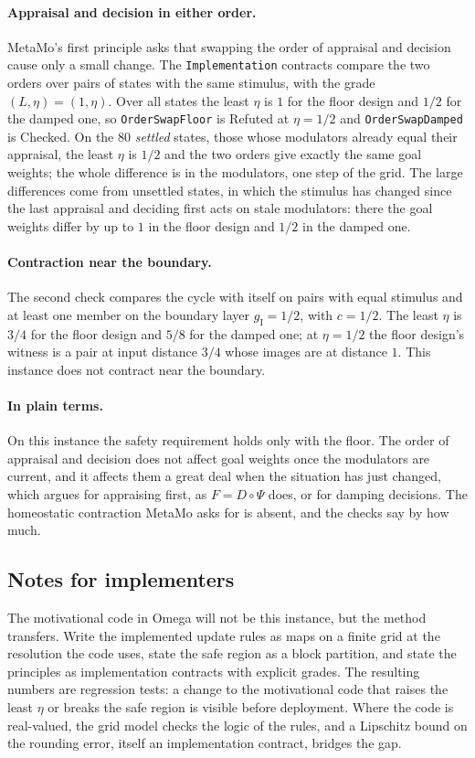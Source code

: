 \documentclass[11pt]{article}
\newcommand{\code}[1]{\texttt{#1}}
\newcommand{\plain}{\paragraph{In plain terms.}}
\theoremstyle{definition}
\theoremstyle{plain}
\begin{document}
\paragraph{Appraisal and decision in either order.} MetaMo's first principle asks that swapping the
order of appraisal and decision cause only a small change. The \code{Implementation} contracts
compare the two orders over pairs of states with the same stimulus, with the grade
$(L,\eta)=(1,\eta)$. Over all states the least $\eta$ is $1$ for the floor design and $1/2$ for the
damped one, so \code{OrderSwapFloor} is Refuted at $\eta=1/2$ and \code{OrderSwapDamped} is Checked.
On the $80$ \emph{settled} states, those whose modulators already equal their appraisal, the least
$\eta$ is $1/2$ and the two orders give exactly the same goal weights; the whole difference is in
the modulators, one step of the grid. The large differences come from unsettled states, in which the
stimulus has changed since the last appraisal and deciding first acts on stale modulators: there
the goal weights differ by up to $1$ in the floor design and $1/2$ in the damped one.

\paragraph{Contraction near the boundary.} The second check compares the cycle with itself on pairs
with equal stimulus and at least one member on the boundary layer $g_{\mathrm{I}}=1/2$, with
$c=1/2$. The least $\eta$ is $3/4$ for the floor design and $5/8$ for the damped one; at $\eta=1/2$
the floor design's witness is a pair at input distance $3/4$ whose images are at distance $1$. This
instance does not contract near the boundary.

\plain On this instance the safety requirement holds only with the floor. The order of appraisal
and decision does not affect goal weights once the modulators are current, and it affects them a
great deal when the situation has just changed, which argues for appraising first, as $F=D\circ\Psi$
does, or for damping decisions. The homeostatic contraction MetaMo asks for is absent, and the
checks say by how much.

\subsection{Notes for implementers}

The motivational code in Omega will not be this instance, but the method transfers. Write the
implemented update rules as maps on a finite grid at the resolution the code uses, state the safe
region as a block partition, and state the principles as implementation contracts with explicit
grades. The resulting numbers are regression tests: a change to the motivational code that raises
the least $\eta$ or breaks the safe region is visible before deployment. Where the code is
real-valued, the grid model checks the logic of the rules, and a Lipschitz bound on the rounding
error, itself an implementation contract, bridges the gap.
\end{document}
